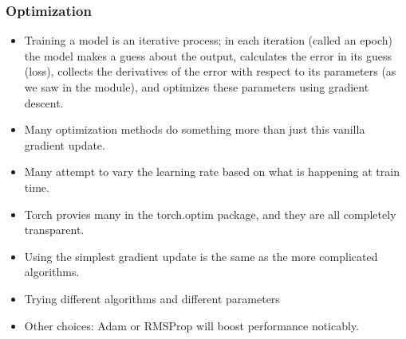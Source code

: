 \begin{frame}[fragile]
\frametitle{Optimization}

\begin{itemize}
\item Training a model is an iterative process; in each iteration (called an epoch) the model makes a guess about the output, calculates the error in its guess (loss), collects the derivatives of the error with respect to its parameters (as we saw in the module), and optimizes these parameters using gradient descent.
\item Many optimization methods do something more than just this vanilla gradient update.
\item Many attempt to vary the learning rate based on what is happening at train time. 
\item Torch provies many in the torch.optim package, and they are all completely transparent. 
\item Using the simplest gradient update is the same as the more complicated algorithms. 
\item Trying different algorithms and different parameters 
\item Other choices: Adam or RMSProp will boost performance noticably.
\end{itemize}

\end{frame} 

